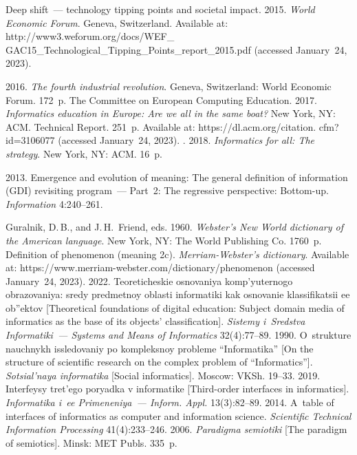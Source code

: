 \begin{multicols}{2}
{{\begin{thebibliography}{99}
 Deep shift~--- technology tipping points and societal impact. 2015. \textit{World Economic Forum}. Geneva, 
Switzerland. Available at: {\sf  
http://www3.weforum.org/docs/WEF\_ GAC15\_Technological\_Tipping\_Points\_report\_2015.pdf} (accessed 
January~24, 2023).

 2016. \textit{The fourth industrial revolution}. Geneva, Switzerland: World 
Economic Forum. 172~p.
The Committee on European Computing Education. 2017. \textit{Informatics education in Europe: Are we 
all in the same boat?} New York, NY: ACM. Technical Report. 251~p. Available at: {\sf 
https://dl.acm.org/citation. cfm?id=3106077} (accessed January~24, 2023).
. 2018. \textit{Informatics 
for all: The strategy}. New York, NY: ACM. 16~p.


2013. Emergence and evolution of meaning: The general definition of information (GDI) revisiting 
program~--- Part~2: The regressive perspective: Bottom-up. \textit{Information} 4:240--261.

Guralnik, D.\,B., and J.\,H.~Friend, eds. 1960. \textit{Webster's New World dictionary of the 
American language}. New York, NY: The World Publishing Co. 1760~p.
 Definition of phenomenon (meaning 2c). \textit{Merriam-Webster's dictionary}. Available at: {\sf 
https://www.merriam-webster.com/dictionary/phenomenon} (accessed January~24, 2023).
 2022. Teo\-re\-ti\-che\-skie os\-no\-va\-niya komp'yuter\-no\-go ob\-ra\-zo\-va\-niya: sre\-dy 
pred\-met\-noy ob\-lasti in\-for\-ma\-ti\-ki kak osnovanie klassifikatsii ee ob''\-ek\-tov [Theoretical 
foundations of digital education: Subject domain media of informatics as the base of its objects' 
classification]. \textit{Sistemy i~Sredstva Informatiki~--- Systems and Means of Informatics} 
32(4):77--89.
 1990. O~strukture nauchnykh issledovaniy po kompleksnoy probleme 
``Informatika'' [On the structure of scientific research on the complex problem of ``Informatics'']. 
\textit{Sotsial'naya informatika} [Social informatics]. Moscow: 
VKSh. 19--33.
 2019. Interfeysy tret'ego poryadka v informatike [Third-order interfaces in 
informatics]. \textit{Informatika i~ee Primeneniya~--- Inform. Appl.} 13(3):82--89.
 2014. A~table of interfaces of informatics as computer and information science. 
\textit{Scientific Technical Information Processing} 41(4):233--246.
 2006. \textit{Paradigma semiotiki} [The paradigm of semiotics]. Minsk: MET 
Publs. 335~p.


\end{thebibliography}}}
\end{multicols}
